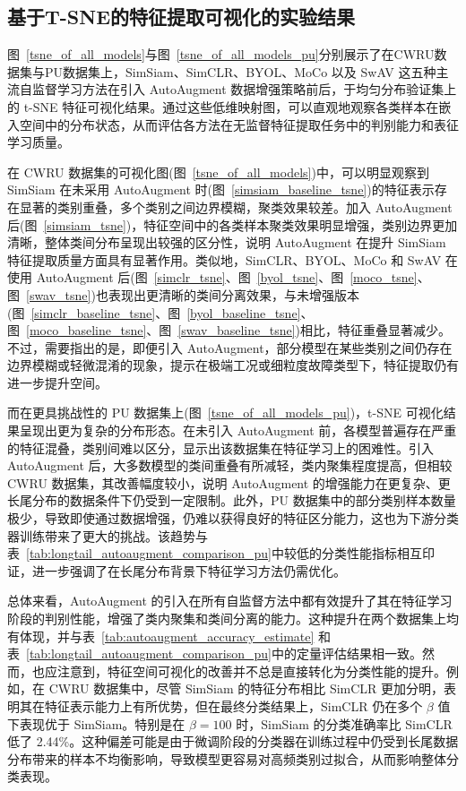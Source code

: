\documentclass[master]{thesis-uestc}
\begin{document}
\subsection{基于T-SNE的特征提取可视化的实验结果}
图~\ref{tsne_of_all_models}与图~\ref{tsne_of_all_models_pu}分别展示了在CWRU数据集与PU数据集上，SimSiam、SimCLR、BYOL、MoCo 以及 SwAV 这五种主流自监督学习方法在引入 AutoAugment 数据增强策略前后，于均匀分布验证集上的 t-SNE 特征可视化结果。通过这些低维映射图，可以直观地观察各类样本在嵌入空间中的分布状态，从而评估各方法在无监督特征提取任务中的判别能力和表征学习质量。

在 CWRU 数据集的可视化图(图~\ref{tsne_of_all_models})中，可以明显观察到 SimSiam 在未采用 AutoAugment 时(图~\ref{simsiam_baseline_tsne})的特征表示存在显著的类别重叠，多个类别之间边界模糊，聚类效果较差。加入 AutoAugment 后(图~\ref{simsiam_tsne})，特征空间中的各类样本聚类效果明显增强，类别边界更加清晰，整体类间分布呈现出较强的区分性，说明 AutoAugment 在提升 SimSiam 特征提取质量方面具有显著作用。类似地，SimCLR、BYOL、MoCo 和 SwAV 在使用 AutoAugment 后(图~\ref{simclr_tsne}、图~\ref{byol_tsne}、图~\ref{moco_tsne}、图~\ref{swav_tsne})也表现出更清晰的类间分离效果，与未增强版本(图~\ref{simclr_baseline_tsne}、图~\ref{byol_baseline_tsne}、图~\ref{moco_baseline_tsne}、图~\ref{swav_baseline_tsne})相比，特征重叠显著减少。不过，需要指出的是，即便引入 AutoAugment，部分模型在某些类别之间仍存在边界模糊或轻微混淆的现象，提示在极端工况或细粒度故障类型下，特征提取仍有进一步提升空间。

而在更具挑战性的 PU 数据集上(图~\ref{tsne_of_all_models_pu})，t-SNE 可视化结果呈现出更为复杂的分布形态。在未引入 AutoAugment 前，各模型普遍存在严重的特征混叠，类别间难以区分，显示出该数据集在特征学习上的困难性。引入 AutoAugment 后，大多数模型的类间重叠有所减轻，类内聚集程度提高，但相较 CWRU 数据集，其改善幅度较小，说明 AutoAugment 的增强能力在更复杂、更长尾分布的数据条件下仍受到一定限制。此外，PU 数据集中的部分类别样本数量极少，导致即使通过数据增强，仍难以获得良好的特征区分能力，这也为下游分类器训练带来了更大的挑战。该趋势与表~\ref{tab:longtail_autoaugment_comparison_pu}中较低的分类性能指标相互印证，进一步强调了在长尾分布背景下特征学习方法仍需优化。

总体来看，AutoAugment 的引入在所有自监督方法中都有效提升了其在特征学习阶段的判别性能，增强了类内聚集和类间分离的能力。这种提升在两个数据集上均有体现，并与表~\ref{tab:autoaugment_accuracy_estimate} 和表~\ref{tab:longtail_autoaugment_comparison_pu}中的定量评估结果相一致。然而，也应注意到，特征空间可视化的改善并不总是直接转化为分类性能的提升。例如，在 CWRU 数据集中，尽管 SimSiam 的特征分布相比 SimCLR 更加分明，表明其在特征表示能力上有所优势，但在最终分类结果上，SimCLR 仍在多个 $\beta$ 值下表现优于 SimSiam。特别是在 $\beta=100$ 时，SimSiam 的分类准确率比 SimCLR 低了 2.44\%。这种偏差可能是由于微调阶段的分类器在训练过程中仍受到长尾数据分布带来的样本不均衡影响，导致模型更容易对高频类别过拟合，从而影响整体分类表现。
\end{document}
